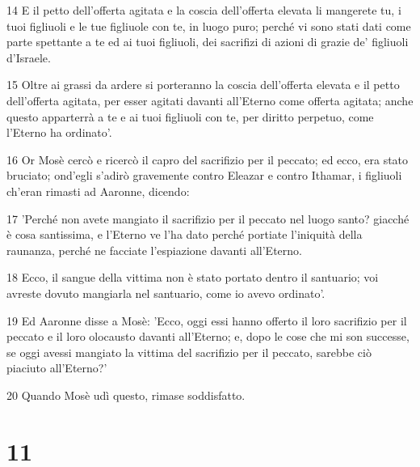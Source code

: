 \par 14 E il petto dell'offerta agitata e la coscia dell'offerta elevata li mangerete tu, i tuoi figliuoli e le tue figliuole con te, in luogo puro; perché vi sono stati dati come parte spettante a te ed ai tuoi figliuoli, dei sacrifizi di azioni di grazie de' figliuoli d'Israele.
\par 15 Oltre ai grassi da ardere si porteranno la coscia dell'offerta elevata e il petto dell'offerta agitata, per esser agitati davanti all'Eterno come offerta agitata; anche questo apparterrà a te e ai tuoi figliuoli con te, per diritto perpetuo, come l'Eterno ha ordinato'.
\par 16 Or Mosè cercò e ricercò il capro del sacrifizio per il peccato; ed ecco, era stato bruciato; ond'egli s'adirò gravemente contro Eleazar e contro Ithamar, i figliuoli ch'eran rimasti ad Aaronne, dicendo:
\par 17 'Perché non avete mangiato il sacrifizio per il peccato nel luogo santo? giacché è cosa santissima, e l'Eterno ve l'ha dato perché portiate l'iniquità della raunanza, perché ne facciate l'espiazione davanti all'Eterno.
\par 18 Ecco, il sangue della vittima non è stato portato dentro il santuario; voi avreste dovuto mangiarla nel santuario, come io avevo ordinato'.
\par 19 Ed Aaronne disse a Mosè: 'Ecco, oggi essi hanno offerto il loro sacrifizio per il peccato e il loro olocausto davanti all'Eterno; e, dopo le cose che mi son successe, se oggi avessi mangiato la vittima del sacrifizio per il peccato, sarebbe ciò piaciuto all'Eterno?'
\par 20 Quando Mosè udì questo, rimase soddisfatto.

\chapter{11}

